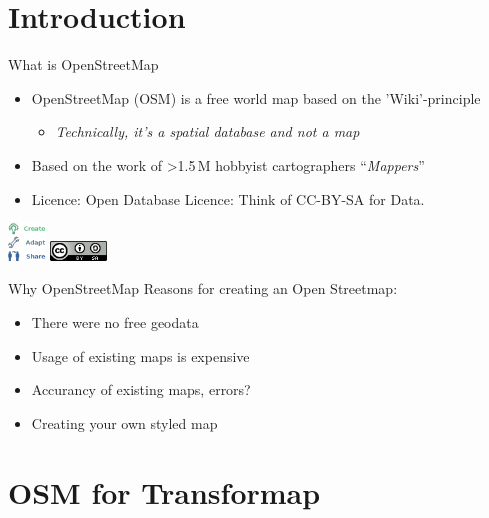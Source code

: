 \documentclass{beamer}
\begin{document}
\section{Introduction}

\begin{frame}{What is OpenStreetMap}

\begin{itemize}
  \item OpenStreetMap (OSM) is a free world map based on the 'Wiki'-principle
  \begin{itemize}
    \item \emph{Technically, it's a spatial database and not a map}
  \end{itemize}
  \item Based on the work of \textgreater 1.5\,M hobbyist cartographers ``\emph{Mappers}''
      \pause
  \item Licence: Open Database Licence: Think of CC-BY-SA for Data.
\end{itemize}

\begin{center}
\includegraphics[width=1cm]{ODbL.png}
\hspace{2cm}
\includegraphics[width=1.5cm]{cc-by-sa.png}
\end{center}

\end{frame}

\begin{frame}{Why OpenStreetMap}
	Reasons for creating an Open Streetmap:
\begin{itemize}
  \item There were no free geodata
  \item Usage of existing maps is expensive
  \item Accurancy of existing maps, errors? 
  \item Creating your own styled map
\end{itemize}


\end{frame}

\section{OSM for Transformap}
\end{document}
